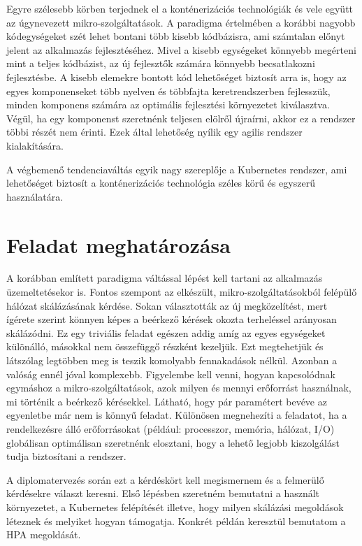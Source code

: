 Egyre szélesebb körben terjednek el a konténerizációs technológiák és vele együtt az úgynevezett mikro-szolgáltatások.
A paradigma értelmében a korábbi nagyobb kódegységeket szét lehet bontani több kisebb kódbázisra, ami számtalan előnyt jelent az alkalmazás fejlesztéséhez.
Mivel a kisebb egységeket könnyebb megérteni mint a teljes kódbázist, az új fejlesztők számára könnyebb becsatlakozni fejlesztésbe.
A kisebb elemekre bontott kód lehetőséget biztosít arra is, hogy az egyes komponenseket több
nyelven és többfajta keretrendszerben fejlesszük, minden komponens számára az optimális fejlesztési környezetet kiválasztva. 
Végül, ha egy komponenst szeretnénk teljesen elölről újraírni, akkor ez a rendszer többi részét nem érinti.
Ezek által lehetőség nyílik egy agilis rendszer kialakítására.

A végbemenő tendenciaváltás egyik nagy szereplője a Kubernetes rendszer, ami lehetőséget biztosít a konténerizációs technológia széles körű és egyszerű használatára.

\section{Feladat meghatározása}
A korábban említett paradigma váltással lépést kell tartani az alkalmazás üzemeltetésekor is. 
Fontos szempont az elkészült, mikro-szolgáltatásokból felépülő hálózat skálázásának kérdése. 
Sokan választották az új megközelítést, mert ígérete szerint könnyen képes a beérkező kérések okozta terheléssel arányosan skálázódni.
Ez egy triviális feladat egészen addig amíg az egyes egységeket különálló, másokkal nem összefüggő részként kezeljük.
Ezt megtehetjük és látszólag legtöbben meg is teszik komolyabb fennakadások nélkül. 
Azonban a valóság ennél jóval komplexebb. Figyelembe kell venni, hogyan kapcsolódnak egymáshoz a mikro-szolgáltatások, azok milyen és mennyi erőforrást használnak, mi történik a beérkező kérésekkel.
Látható, hogy pár paramétert bevéve az egyenletbe már nem is könnyű feladat. 
Különösen megnehezíti a feladatot, ha a rendelkezésre álló erőforrásokat (például: processzor, memória, hálózat, I/O) globálisan optimálisan szeretnénk elosztani, hogy a lehető legjobb kiszolgálást tudja biztosítani a rendszer. 

A diplomatervezés során ezt a kérdéskört kell megismernem és a felmerülő kérdésekre választ keresni. 
Első lépésben szeretném bemutatni a használt környezetet, a Kubernetes felépítését illetve, hogy
milyen skálázási megoldások léteznek és melyiket hogyan támogatja.
Konkrét példán keresztül bemutatom a HPA megoldását. 

